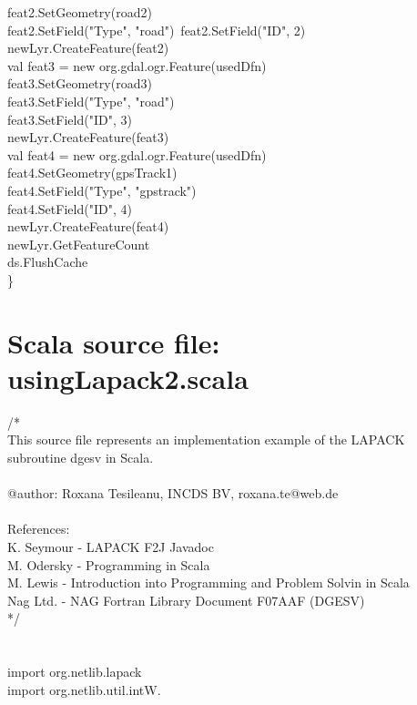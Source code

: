 \documentclass {article}
\begin{document}
\begin{appendices}
feat2.SetGeometry(road2)\\
feat2.SetField("Type", "road")\
feat2.SetField("ID", 2)\\
newLyr.CreateFeature(feat2)\\
val feat3 = new org.gdal.ogr.Feature(usedDfn)\\
feat3.SetGeometry(road3)\\
feat3.SetField("Type", "road")\\
feat3.SetField("ID", 3)\\
newLyr.CreateFeature(feat3)\\
val feat4 = new org.gdal.ogr.Feature(usedDfn)\\
feat4.SetGeometry(gpsTrack1)\\
feat4.SetField("Type", "gpstrack")\\
feat4.SetField("ID", 4)\\
newLyr.CreateFeature(feat4)\\
newLyr.GetFeatureCount\\
ds.FlushCache\\

\}\\

\section{Scala source file: usingLapack2.scala}

/*\\ 
This source file represents an implementation example of the LAPACK subroutine dgesv in Scala.  
\\
\\
@author: Roxana Tesileanu, INCDS BV, roxana.te@web.de
\\
\\
References:\\
K. Seymour - LAPACK F2J Javadoc\\
M. Odersky - Programming in Scala\\
M. Lewis - Introduction into Programming and Problem Solvin in Scala\\
Nag Ltd. - NAG Fortran Library Document F07AAF (DGESV)\\
*/\\
\\
\\
import org.netlib.lapack\\
import org.netlib.util.intW.\underline{\space}\\


\end{appendices}
\end{document}
